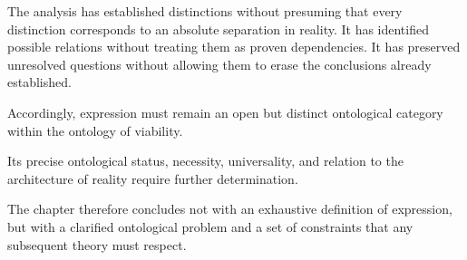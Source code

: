 The analysis has established distinctions without
presuming that every distinction corresponds to
an absolute separation in reality. It has identified
possible relations without treating them as proven
dependencies. It has preserved unresolved questions
without allowing them to erase the conclusions
already established.

Accordingly, expression must remain an open but
distinct ontological category within the ontology
of viability.

Its precise ontological status, necessity, universality,
and relation to the architecture of reality require
further determination.

The chapter therefore concludes not with an exhaustive
definition of expression, but with a clarified
ontological problem and a set of constraints
that any subsequent theory must respect.

